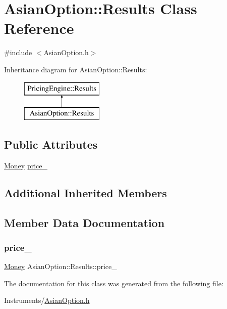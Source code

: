 \hypertarget{class_asian_option_1_1_results}{}\section{Asian\+Option\+:\+:Results Class Reference}
\label{class_asian_option_1_1_results}


{\ttfamily \#include $<$Asian\+Option.\+h$>$}

Inheritance diagram for Asian\+Option\+:\+:Results\+:\begin{figure}[H]
\begin{center}
\leavevmode
\includegraphics[height=2.000000cm]{class_asian_option_1_1_results}
\end{center}
\end{figure}
\subsection*{Public Attributes}
\begin{DoxyCompactItemize}
\item 
\hyperlink{_name_def_8h_a5a9d48c16a694e9a2d9f1eca730dc8c5}{Money} \hyperlink{class_asian_option_1_1_results_a9e4e4e2612f105b940b1562d7f126a89}{price\+\_\+}
\end{DoxyCompactItemize}
\subsection*{Additional Inherited Members}


\subsection{Member Data Documentation}
\hypertarget{class_asian_option_1_1_results_a9e4e4e2612f105b940b1562d7f126a89}{}\label{class_asian_option_1_1_results_a9e4e4e2612f105b940b1562d7f126a89} 
\subsubsection{\texorpdfstring{price\+\_\+}{price\_}}
{\footnotesize\ttfamily \hyperlink{_name_def_8h_a5a9d48c16a694e9a2d9f1eca730dc8c5}{Money} Asian\+Option\+::\+Results\+::price\+\_\+}



The documentation for this class was generated from the following file\+:\begin{DoxyCompactItemize}
\item 
Instruments/\hyperlink{_asian_option_8h}{Asian\+Option.\+h}\end{DoxyCompactItemize}
